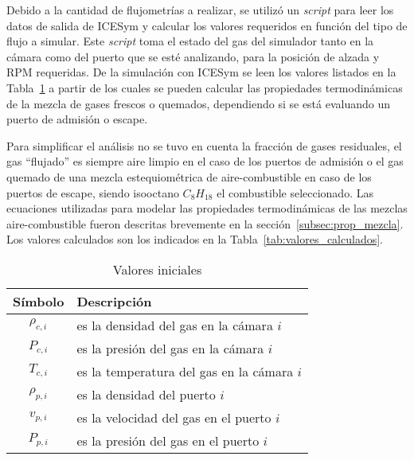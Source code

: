 Debido a la cantidad de flujometrías a realizar, se utilizó un \emph{script}
para leer los datos de salida de ICESym y calcular los valores requeridos en
función del tipo de flujo a simular.
%
Este \emph{script} toma el estado del gas del simulador tanto en la cámara como
del puerto que se esté analizando, para la posición de alzada y RPM requeridas.
%
De la simulación con ICESym se leen los valores listados en la
Tabla~\ref{tab:valores_iniciales} a partir de los cuales se pueden calcular las
propiedades termodinámicas de la mezcla de gases frescos o quemados,
dependiendo si se está evaluando un puerto de admisión o escape.

Para simplificar el análisis no se tuvo en cuenta la fracción de gases
residuales, el gas ``flujado'' es siempre aire limpio en el caso de los puertos
de admisión o el gas quemado de una mezcla estequiométrica de aire-combustible
en caso de los puertos de escape, siendo isooctano $C_{8}H_{18}$ el combustible
seleccionado.
%
Las ecuaciones utilizadas para modelar las propiedades termodinámicas de las
mezclas aire-combustible fueron descritas brevemente en la
sección~\ref{subsec:prop_mezcla}.
%
Los valores calculados son los indicados en la
Tabla~\ref{tab:valores_calculados}.

\begin{table}
  \centering
  \begin{tabular}{cl}\toprule
    Símbolo & Descripción \\ \midrule
    $\rho_{c,i}$ & es la densidad del gas en la cámara $i$ \\
    $P_{c,i}$ & es la presión del gas en la cámara $i$ \\
    $T_{c,i}$ & es la temperatura del gas en la cámara $i$ \\
    $\rho_{p,i}$ & es la densidad del puerto $i$ \\
    $v_{p,i}$ & es la velocidad del gas en el puerto $i$ \\
    $P_{p,i}$ & es la presión del gas en el puerto $i$ \\ \bottomrule
  \end{tabular}
\caption{Valores iniciales}\label{tab:valores_iniciales}
\end{table}

